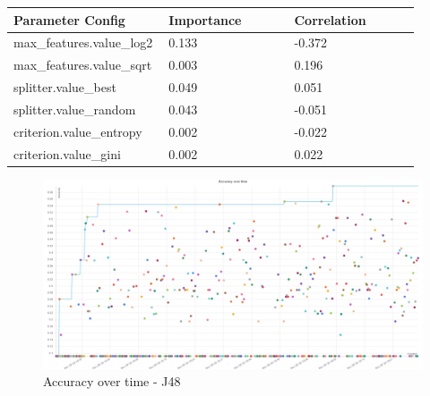 \documentclass[11pt]{article}
\begin{document}
\begin{appendices}
\begin{table}[ht]
\begin{tabular}{|p{0.3\linewidth} | p{0.3\linewidth}| p{0.3\linewidth}|}
    \end{tabular}
  \end{table}\label{J48_ParamImp1}

  \begin{table}[ht]
    \centering
    \begin{tabular}{|p{0.3\linewidth} | p{0.3\linewidth}| p{0.3\linewidth}|} 
      \hline
      \textbf{Parameter Config}  & \textbf{Importance} & \textbf{Correlation} \\ \hline
        max\_features.value\_log2 & 0.133 & -0.372 \\ \hline
        max\_features.value\_sqrt & 0.003 & 0.196 \\ \hline
        splitter.value\_best & 0.049 & 0.051 \\ \hline
        splitter.value\_random & 0.043 & -0.051 \\ \hline
        criterion.value\_entropy & 0.002 & -0.022 \\ \hline
        criterion.value\_gini & 0.002 & 0.022 \\ \hline

    \end{tabular}
  \end{table}\label{J48_ParamImp2}

\begin{figure}
  \caption {Accuracy over time - J48} \label{J48AccOverTime}
  \centering
  \includegraphics[width = \textwidth, height = \textwidth, keepaspectratio]{Images/J48 Acc over time.png}
\end{figure}


\end{appendices}
\end{document}
